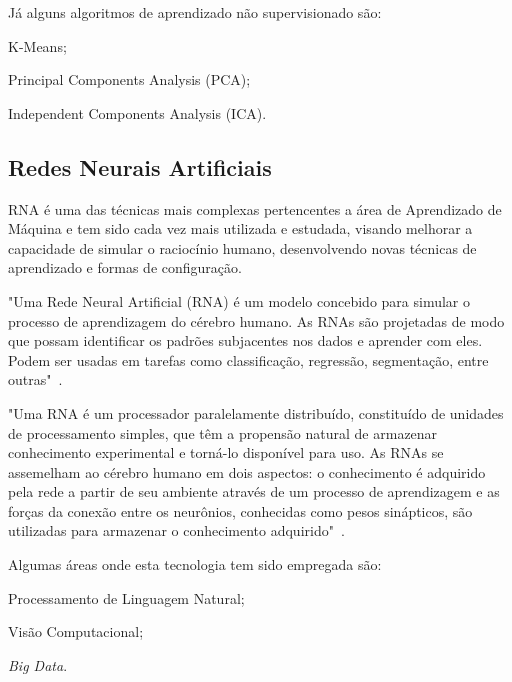 \documentclass[12pt,oneside,a4paper,chapter=TITLE,section=TITLE,sumario
		=tradicional]{abntex2}
\begin{document}
		Já alguns algoritmos de aprendizado não supervisionado são:
		
		\begin{lista}
			\item K-Means;
			\item Principal Components Analysis (PCA);
			\item Independent Components Analysis (ICA).
		\end{lista}
				
		\subsection{Redes Neurais Artificiais}
		\label{sec:redesneurais}
		
		RNA é uma das técnicas mais complexas pertencentes a área de Aprendizado de Máquina e tem sido cada vez mais utilizada e estudada, visando melhorar a capacidade de simular o raciocínio humano, desenvolvendo novas técnicas de aprendizado e formas de configuração.
		
		\begin{citacao}
			"Uma Rede Neural Artificial (RNA) é um modelo concebido para simular o processo de aprendizagem do cérebro humano. As RNAs são projetadas de modo que possam identificar os padrões subjacentes nos dados e aprender com eles. Podem ser usadas em tarefas como classificação, regressão, segmentação, entre outras"~\cite[p.368]{joshi2017}.
		\end{citacao}
		
		\begin{citacao}
			"Uma RNA é um processador paralelamente distribuído, constituído de unidades de processamento simples, que têm a propensão natural de armazenar conhecimento experimental e torná-lo disponível para uso. As RNAs se assemelham ao cérebro humano em dois aspectos: o conhecimento é adquirido pela rede a partir de seu ambiente através de um processo de aprendizagem e as forças da conexão entre os neurônios, conhecidas como pesos sinápticos, são utilizadas para armazenar o conhecimento adquirido"~\cite[p.1]{haykin2009redes}.
		\end{citacao}
		
		Algumas áreas onde esta tecnologia tem sido empregada são:
		
		\begin{lista}
			\item Processamento de Linguagem Natural;
			\item Visão Computacional;
			\item \textit{Big Data}.		
		\end{lista}
							
\end{document}
